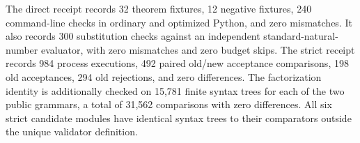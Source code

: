 The direct receipt records 32 theorem fixtures, 12 negative fixtures,
240 command-line checks in ordinary and optimized Python, and zero
mismatches. It also records 300 substitution checks against an independent
standard-natural-number evaluator, with zero mismatches and zero budget
skips. The strict receipt records 984 process executions, 492 paired
old/new acceptance comparisons, 198 old acceptances, 294 old rejections,
and zero differences. The factorization identity is additionally checked
on 15,781 finite syntax trees for each of the two public grammars, a total
of 31,562 comparisons with zero differences. All six strict candidate
modules have identical syntax trees to their comparators outside the
unique validator definition.
